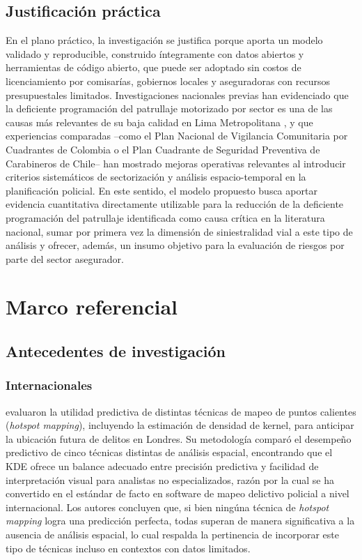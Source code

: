\documentclass[12pt,letterpaper]{report}
\begin{document}
\subsection{Justificaci\'on pr\'actica}
En el plano pr\'actico, la investigaci\'on se justifica porque aporta un modelo validado y reproducible, construido \'integramente con datos abiertos y herramientas de c\'odigo abierto, que puede ser adoptado sin costos de licenciamiento por comisar\'ias, gobiernos locales y aseguradoras con recursos presupuestales limitados. Investigaciones nacionales previas han evidenciado que la deficiente programaci\'on del patrullaje motorizado por sector es una de las causas m\'as relevantes de su baja calidad en Lima Metropolitana \citep{sanchezguevara2022tabcop}, y que experiencias comparadas --como el Plan Nacional de Vigilancia Comunitaria por Cuadrantes de Colombia o el Plan Cuadrante de Seguridad Preventiva de Carabineros de Chile-- han mostrado mejoras operativas relevantes al introducir criterios sistem\'aticos de sectorizaci\'on y an\'alisis espacio-temporal en la planificaci\'on policial. En este sentido, el modelo propuesto busca aportar evidencia cuantitativa directamente utilizable para la reducci\'on de la deficiente programaci\'on del patrullaje identificada como causa cr\'itica en la literatura nacional, sumar por primera vez la dimensi\'on de siniestralidad vial a este tipo de an\'alisis y ofrecer, adem\'as, un insumo objetivo para la evaluaci\'on de riesgos por parte del sector asegurador.

\section{Marco referencial}

\subsection{Antecedentes de investigaci\'on}

\subsubsection{Internacionales}

\citet{chainey2008kde} evaluaron la utilidad predictiva de distintas t\'ecnicas de mapeo de puntos calientes (\textit{hotspot mapping}), incluyendo la estimaci\'on de densidad de kernel, para anticipar la ubicaci\'on futura de delitos en Londres. Su metodolog\'ia compar\'o el desempe\~no predictivo de cinco t\'ecnicas distintas de an\'alisis espacial, encontrando que el KDE ofrece un balance adecuado entre precisi\'on predictiva y facilidad de interpretaci\'on visual para analistas no especializados, raz\'on por la cual se ha convertido en el est\'andar de facto en software de mapeo delictivo policial a nivel internacional. Los autores concluyen que, si bien ning\'una t\'ecnica de \textit{hotspot mapping} logra una predicci\'on perfecta, todas superan de manera significativa a la ausencia de an\'alisis espacial, lo cual respalda la pertinencia de incorporar este tipo de t\'ecnicas incluso en contextos con datos limitados.
\end{document}
